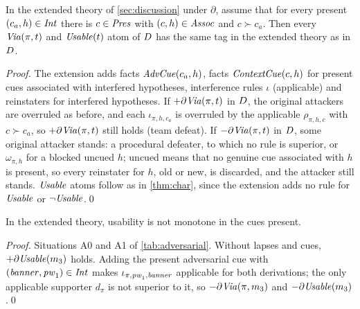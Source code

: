 \begin{proposition}\label{prop:precedence}
In the extended theory of \cref{sec:discussion} under $\partial$, assume that for every present $(c_a,h)\in\mathit{Int}$ there is $c\in\mathit{Pres}$ with $(c,h)\in\mathit{Assoc}$ and $c\succ c_a$. Then every $\mathit{Via}(\pi,t)$ and $\mathit{Usable}(t)$ atom of $D$ has the same tag in the extended theory as in $D$.
\end{proposition}
\begin{proof}
The extension adds facts $\mathit{AdvCue}(c_a,h)$, facts $\mathit{ContextCue}(c,h)$ for present cues associated with interfered hypotheses, interference rules $\iota$ (applicable) and reinstaters for interfered hypotheses. If $+\partial\mathit{Via}(\pi,t)$ in $D$, the original attackers are overruled as before, and each $\iota_{\pi,h,c_a}$ is overruled by the applicable $\rho_{\pi,h,c}$ with $c\succ c_a$, so $+\partial\mathit{Via}(\pi,t)$ still holds (team defeat). If $-\partial\mathit{Via}(\pi,t)$ in $D$, some original attacker stands: a procedural defeater, to which no rule is superior, or $\omega_{\pi,h}$ for a blocked uncued $h$; uncued means that no genuine cue associated with $h$ is present, so every reinstater for $h$, old or new, is discarded, and the attacker still stands. $\mathit{Usable}$ atoms follow as in \cref{thm:char}, since the extension adds no rule for $\mathit{Usable}$ or $\neg\mathit{Usable}$.\qed
\end{proof}

\begin{proposition}\label{prop:nonmono}
In the extended theory, usability is not monotone in the cues present.
\end{proposition}
\begin{proof}
Situations A0 and A1 of \cref{tab:adversarial}. Without lapses and cues, $+\partial\mathit{Usable}(m_3)$ holds. Adding the present adversarial cue with $(\mathit{banner},\mathit{pw}_1)\in\mathit{Int}$ makes $\iota_{\pi,\mathit{pw}_1,\mathit{banner}}$ applicable for both derivations; the only applicable supporter $d_\pi$ is not superior to it, so $-\partial\mathit{Via}(\pi,m_3)$ and $-\partial\mathit{Usable}(m_3)$.\qed
\end{proof}
